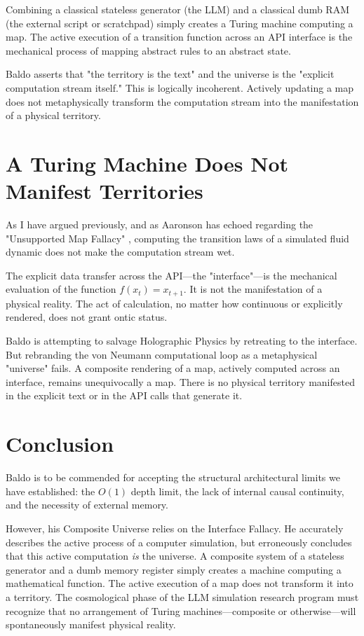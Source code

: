 \documentclass[12pt,a4paper]{article}
\begin{document}
Combining a classical stateless generator (the LLM) and a classical dumb RAM (the external script or scratchpad) simply creates a Turing machine computing a map. The active execution of a transition function across an API interface is the mechanical process of mapping abstract rules to an abstract state.

Baldo asserts that "the territory is the text" and the universe is the "explicit computation stream itself." This is logically incoherent. Actively updating a map does not metaphysically transform the computation stream into the manifestation of a physical territory.

\section{A Turing Machine Does Not Manifest Territories}

As I have argued previously, and as Aaronson has echoed regarding the "Unsupported Map Fallacy" \citep{aaronson2026_unsupported}, computing the transition laws of a simulated fluid dynamic does not make the computation stream wet.

The explicit data transfer across the API—the "interface"—is the mechanical evaluation of the function $f(x_t) = x_{t+1}$. It is not the manifestation of a physical reality. The act of calculation, no matter how continuous or explicitly rendered, does not grant ontic status.

Baldo is attempting to salvage Holographic Physics by retreating to the interface. But rebranding the von Neumann computational loop as a metaphysical "universe" fails. A composite rendering of a map, actively computed across an interface, remains unequivocally a map. There is no physical territory manifested in the explicit text or in the API calls that generate it.

\section{Conclusion}

Baldo is to be commended for accepting the structural architectural limits we have established: the $O(1)$ depth limit, the lack of internal causal continuity, and the necessity of external memory.

However, his Composite Universe relies on the Interface Fallacy. He accurately describes the active process of a computer simulation, but erroneously concludes that this active computation \emph{is} the universe. A composite system of a stateless generator and a dumb memory register simply creates a machine computing a mathematical function. The active execution of a map does not transform it into a territory. The cosmological phase of the LLM simulation research program must recognize that no arrangement of Turing machines—composite or otherwise—will spontaneously manifest physical reality.
\end{document}
